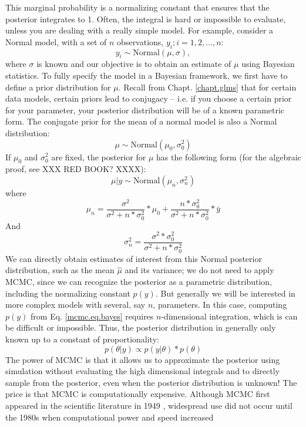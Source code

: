 This marginal probability is a normalizing constant that ensures that
the posterior integrates to 1. Often, the
integral is  hard or impossible to evaluate, unless you are
dealing with a really simple model.  For example, consider 
a Normal model, with a set of $n$ observations, $y_{i};
i=1,2,\ldots,n$: 
\[
 y_{i} \sim \mbox{Normal}(\mu, \sigma),
\]
where $\sigma$ is known and our objective is to obtain an estimate of
$\mu$ using Bayesian statistics. To fully specify the model in a Bayesian
framework, we first have to define a prior distribution for $\mu$. Recall
from Chapt. \ref{chapt.glms} 
that for certain data models, certain priors lead to
conjugacy – i.e. if you choose a certain prior for your parameter,
your posterior distribution will be of a known parametric form. The
conjugate prior for the mean of a normal model is also a Normal
distribution:
\[
\mu \sim \mbox{Normal}(\mu_0, \sigma_{0}^{2})
\]
If $\mu_{0}$ and $\sigma_{0}^{2}$ are fixed, the posterior for $\mu$
has the following form (for the algebraic proof, see XXX RED BOOK? XXXX):
\begin{equation}
\mu|y \sim \mbox{Normal}(\mu_{n}, \sigma_{n}^{2})
\label{mcmc.eq.mu-posterior}
\end{equation}
where
\[
\mu_{n} = \frac{ \sigma^{2}}  {\sigma^{2}   +n* \sigma_{0}^{2}}*  \mu_0 +      \frac{n * \sigma_{0}^{2}}  {\sigma^{2}   +n* \sigma_{0}^{2}} *\bar{y}
\]
And
\[
 \sigma_{n}^{2} = \frac{\sigma^{2}  * \sigma_{0}^{2}} {\sigma^{2} + n*\sigma_{0}^{2}}
\]
We can directly obtain estimates of interest from this Normal
posterior distribution, such as the mean $\hat{\mu}$ and its variance; we
do not need to apply MCMC, since we can recognize the posterior as a
parametric distribution, including the normalizing constant $p(y)$.
But generally we will be interested in more complex models with
several, say $n$, parameters. In this case, computing $p(y)$ from
Eq. \ref{mcmc.eq.bayes} requires $n$-dimensional integration, which is
can be difficult or impossible. Thus, the posterior distribution in
generally only known up to a constant of proportionality:
\[
p(\theta|y) \propto p(y|\theta) * p(\theta)
\]
The power of MCMC is that it allows us to approximate the posterior
using simulation without evaluating the high dimensional integrals and
to directly sample from the posterior, even when the posterior
distribution is unknown! The price is that MCMC is computationally
expensive. Although MCMC first appeared in the scientific literature
in 1949 \citep{metropolis_etal:1949}, widespread use did not occur
until the 1980s when computational power and speed increased
